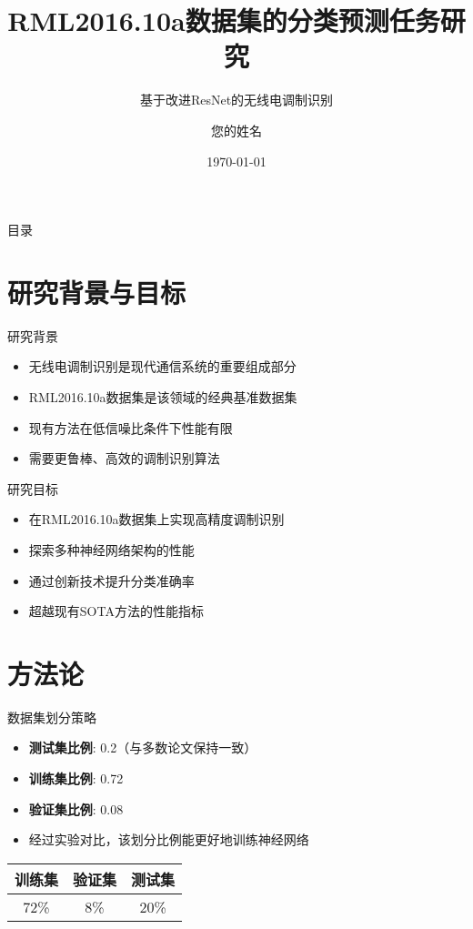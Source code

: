 \documentclass[aspectratio=169]{beamer}
\title{RML2016.10a数据集的分类预测任务研究}
\subtitle{基于改进ResNet的无线电调制识别}
\author{您的姓名}
\institute{您的机构}
\date{\today}
\begin{document}
\begin{frame}
\titlepage
\end{frame}

\begin{frame}{目录}
\tableofcontents
\end{frame}

\section{研究背景与目标}

\begin{frame}{研究背景}
\begin{itemize}
    \item 无线电调制识别是现代通信系统的重要组成部分
    \item RML2016.10a数据集是该领域的经典基准数据集
    \item 现有方法在低信噪比条件下性能有限
    \item 需要更鲁棒、高效的调制识别算法
\end{itemize}
\end{frame}

\begin{frame}{研究目标}
\begin{itemize}
    \item 在RML2016.10a数据集上实现高精度调制识别
    \item 探索多种神经网络架构的性能
    \item 通过创新技术提升分类准确率
    \item 超越现有SOTA方法的性能指标
\end{itemize}
\end{frame}

\section{方法论}

\begin{frame}{数据集划分策略}
\begin{itemize}
    \item \textbf{测试集比例}: 0.2（与多数论文保持一致）
    \item \textbf{训练集比例}: 0.72
    \item \textbf{验证集比例}: 0.08
    \item 经过实验对比，该划分比例能更好地训练神经网络
\end{itemize}

\vspace{1em}
\begin{center}
\begin{tabular}{|c|c|c|}
\hline
训练集 & 验证集 & 测试集 \\
\hline
72\% & 8\% & 20\% \\
\hline
\end{tabular}
\end{center}
\end{frame}
\end{document}
